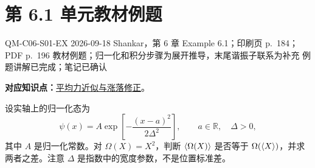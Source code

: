 \section{第 6.1 单元教材例题}
\label{exercise-set:QM-C06-S01}

\exercisemeta
  {QM-C06-S01-EX}
  {2026-09-18}
  {Shankar，第 6 章 Example 6.1；印刷页 p.~184；PDF p.~196}
  {教材例题；归一化和积分步骤为展开推导，末尾谐振子联系为补充}
  {例题讲解已完成；笔记已确认}


\textbf{对应知识点：}\hyperref[topic:QM-C06-S01-T02]{平均力近似与涨落修正}。

设实轴上的归一化态为
\begin{equation}
  \psi(x)=A\exp\left[-\frac{(x-a)^2}{2\Delta^2}\right],
  \qquad a\in\mathbb R,\quad\Delta>0,
\end{equation}
其中 $A$ 是归一化常数。对 $\Omega(X)=X^2$，判断 $\left\langle \Omega(X) \right\rangle$ 是否等于 $\Omega(\left\langle X \right\rangle)$，并求两者之差。注意 $\Delta$ 是指数中的宽度参数，不是位置标准差。

